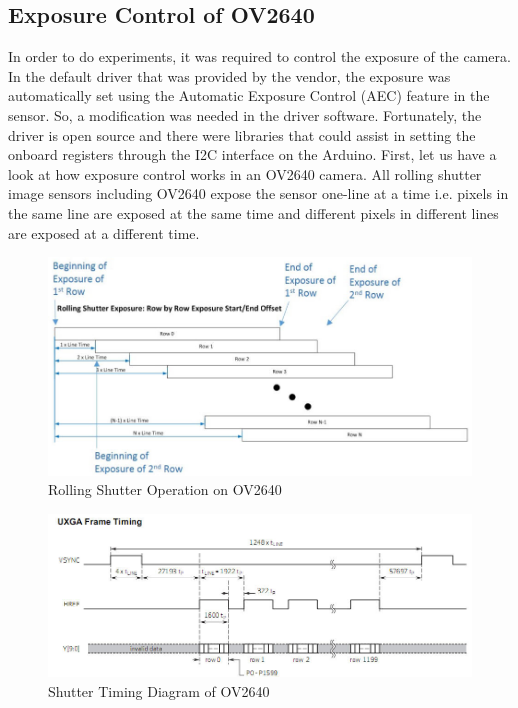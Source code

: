 \subsection{Exposure Control of OV2640}
In order to do experiments, it was required to control the exposure of the camera. In the default driver that was provided by the vendor, the exposure was automatically set using the Automatic Exposure Control (AEC) feature in the sensor. So, a modification was needed in the driver software. Fortunately, the driver is open source and there were libraries that could assist in setting the onboard registers through the I2C interface on the Arduino. First, let us have a look at how exposure control works in an OV2640 camera. All rolling shutter image sensors including OV2640 expose the sensor one-line at a time i.e. pixels in the same line are exposed at the same time and different pixels in different lines are exposed at a different time. 

\begin{figure}[!ht]
\includegraphics[width=\textwidth]{pics/rolling_shutter}
\caption{Rolling Shutter Operation on OV2640\cite{RollingShutterOV2640}}
\label{fig:RollingShutterOV2640}
\end{figure}

\begin{figure}[!ht]
\includegraphics[width=\textwidth]{pics/OV2640timing}
\caption{Shutter Timing Diagram of OV2640\cite{RollingShutterOV2640}}
\label{fig:ShutterTimingOV2640}
\end{figure}


